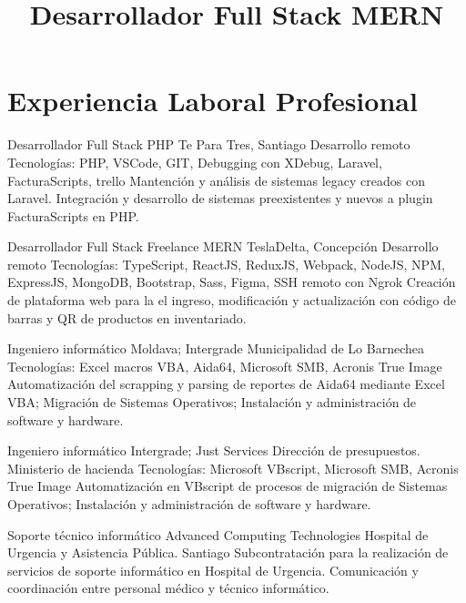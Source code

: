 \documentclass[draft,color,12pt,letterpaper,sans]{moderncv}
\title{Desarrollador Full Stack MERN}
\begin{document}
\makecvtitle %

\section{Experiencia Laboral Profesional}
{Desarrollador Full Stack PHP}
{Te Para Tres, Santiago}
{\newline Desarrollo remoto}
{\newline Tecnolog\'ias: PHP, VSCode, GIT, Debugging con XDebug, Laravel, FacturaScripts, trello}
{Mantenci\'on y an\'alisis de sistemas legacy creados con Laravel. Integraci\'on y desarrollo de sistemas preexistentes y nuevos a plugin FacturaScripts en PHP.\newline}

{Desarrollador Full Stack Freelance MERN}
{TeslaDelta, Concepci\'on}
{\newline Desarrollo remoto}
{\newline Tecnolog\'ias: TypeScript, ReactJS, ReduxJS, Webpack, NodeJS, NPM, ExpressJS, MongoDB, Bootstrap, Sass, Figma, SSH remoto con Ngrok}
{Creaci\'on de plataforma web para la el ingreso, modificaci\'on y actualizaci\'on con c\'odigo de barras y QR de productos en inventariado.\newline}

{Ingeniero inform\'atico}
{Moldava; Intergrade}
{Municipalidad de Lo Barnechea}
{\newline Tecnolog\'ias: Excel macros VBA, Aida64, Microsoft SMB, Acronis True Image}
{Automatizaci\'on del scrapping y parsing de reportes de Aida64 mediante Excel VBA; Migraci\'on de Sistemas Operativos; Instalaci\'on y administraci\'on de software y hardware.\newline}


{Ingeniero inform\'atico}
{Intergrade; Just Services}
{Direcci\'on de presupuestos. Ministerio de hacienda}
{\newline Tecnolog\'ias: Microsoft VBscript, Microsoft SMB, Acronis True Image}
{Automatizaci\'on en VBscript de procesos de migraci\'on de Sistemas Operativos; Instalaci\'on y administraci\'on de software y hardware.\newline}

{Soporte t\'ecnico inform\'atico}
{Advanced Computing Technologies}
{Hospital de Urgencia y Asistencia P\'ublica. Santiago}
{}
{Subcontrataci\'on para la realizaci\'on de servicios de soporte inform\'atico en Hospital de Urgencia. Comunicaci\'on y coordinaci\'on entre personal m\'edico y t\'ecnico inform\'atico.\newline}
\end{document}
